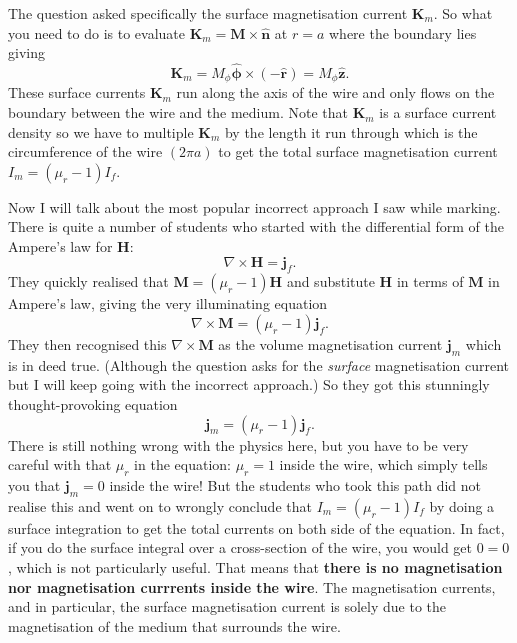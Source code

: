 \documentclass[a4paper]{article}
\begin{document}
The question asked specifically the surface magnetisation current $\mathbf{K}_m$. So what you need to do is to evaluate $\mathbf{K}_m = \mathbf{M} \times \mathbf{\hat{n}}$ at $r=a$ where the boundary lies giving
\[
    \mathbf{K}_m = M_\phi \hat{\mathbf{\phi}} \times (- \mathbf{\hat{r}}) = M_\phi \mathbf{\hat{z}}
.\] 
These surface currents $\mathbf{K}_m$ run along the axis of the wire and only flows on the boundary between the wire and the medium. Note that $\mathbf{K}_m$ is a surface current density so we have to multiple $\mathbf{K}_m$ by the length it run through which is the circumference of the wire $(2\pi a)$ to get the total surface magnetisation current $I_m=(\mu_r -1) I_f$.

Now I will talk about the most popular incorrect approach I saw while marking. There is quite a number of students who started with the differential form of the Ampere's law for $\mathbf{H}$:
\[
\nabla \times \mathbf{H} = \mathbf{j}_f
.\] They quickly realised that $\mathbf{M} = (\mu_r - 1) \mathbf{H}$ and substitute $\mathbf{H}$ in terms of $\mathbf{M}$ in Ampere's law, giving the very illuminating equation 
\[
    \nabla \times \mathbf{M} = (\mu_r - 1) \mathbf{j}_f
.\] They then recognised this $\nabla  \times \mathbf{M}$ as the volume magnetisation current $\mathbf{j}_m$ which is in deed true. (Although the question asks for the \emph{surface} magnetisation current but I will keep going with the incorrect approach.) So they got this stunningly thought-provoking equation 
\[
    \mathbf{j}_m = (\mu_r - 1) \mathbf{j}_f
.\] There is still nothing wrong with the physics here, but you have to be very careful with that $\mu_r$ in the equation:  $\mu_r = 1$ inside the wire, which simply tells you that $\mathbf{j}_m = 0$ inside the wire! But the students who took this path did not realise this and went on to wrongly conclude that $I_m = (\mu_r - 1) I_f$ by doing a surface integration to get the total currents on both side of the equation. In fact, if you do the surface integral over a cross-section of the wire, you would get  $0 = 0$, which is not particularly useful. That means that \textbf{there is no magnetisation nor magnetisation currrents inside the wire}. The magnetisation currents, and in particular, the surface magnetisation current is solely due to the magnetisation of the medium that surrounds the wire.
\end{document}
